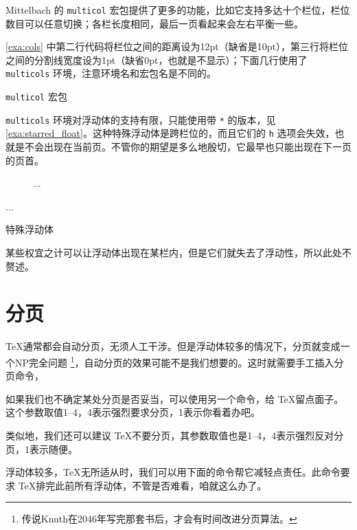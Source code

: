 Mittelbach 的 \texttt{multicol} 宏包提供了更多的功能，比如它支持多达十个栏位，栏位数目可以任意切换；各栏长度相同，最后一页看起来会左右平衡一些。

\autoref{exa:cols} 中第二行代码将栏位之间的距离设为12pt（缺省是10pt），第三行将栏位之间的分割线宽度设为1pt（缺省0pt，也就是不显示）；下面几行使用了 \texttt{multicols} 环境，注意环境名和宏包名是不同的。

\begin{example}[h]
\caption{\texttt{multicol} 宏包}
\label{exa:cols}
\end{example}

\texttt{multicols} 环境对浮动体的支持有限，只能使用带 \texttt{*} 的版本，见 \autoref{exa:starred_float}。这种特殊浮动体是跨栏位的，而且它们的 \texttt{h} 选项会失效，也就是不会出现在当前页。不管你的期望是多么地殷切，它最早也只能出现在下一页的页首。

\begin{example}[h]
\begin{Code}[]
\begin{figure*}[tbp]
...
\end{figure*}

\begin{table*}[tbp]
...
\end{table*}
\end{Code}
\caption{特殊浮动体}
\label{exa:starred_float}
\end{example}

某些权宜之计可以让浮动体出现在某栏内，但是它们就失去了浮动性，所以此处不赘述。

\section{分页}

\TeX 通常都会自动分页，无须人工干涉。但是浮动体较多的情况下，分页就变成一个NP完全问题 \footnote{传说Knuth在2046年写完那套书后，才会有时间改进分页算法。}，自动分页的效果可能不是我们想要的。这时就需要手工插入分页命令，

\begin{Code}[numbers=none]
\newpage
\end{Code}

如果我们也不确定某处分页是否妥当，可以使用另一个命令，给 \TeX 留点面子。这个参数取值1--4，4表示强烈要求分页，1表示你看着办吧。

\begin{Code}[numbers=none]
\pagebreak[3]
\end{Code}

类似地，我们还可以建议 \TeX 不要分页，其参数取值也是1--4，4表示强烈反对分页，1表示随便。

\begin{Code}[numbers=none]
\nopagebreak[2]
\end{Code}

浮动体较多，\TeX 无所适从时，我们可以用下面的命令帮它减轻点责任。此命令要求 \TeX 排完此前所有浮动体，不管是否难看，咱就这么办了。

\begin{Code}[numbers=none]
\clearpage
\end{Code}



